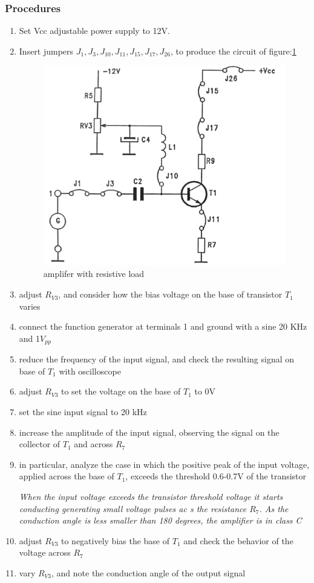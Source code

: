 \documentclass[12pt,a4paper]{report}
\begin{document}
\subsubsection{Procedures}
\begin{enumerate}
    \item Set Vcc adjustable power supply to 12V.
    \item Insert jumpers $J_1, J_3, J_{10}, J_{11}, J_{15}, J_{17}, J_{26}$, to produce the circuit of figure:\ref{fig:B32.2}
    \begin{figure}[H]
        \centering
        \includegraphics[width=0.5\linewidth]{analogue2_2.jpeg}
        \caption{amplifer with resistive load}
        \label{fig:B32.2}
    \end{figure}
    \item adjust $R_{V3}$, and consider how the bias voltage on the base of transistor $T_1$ varies
    \item connect the function generator at terminals 1 and ground with a sine 20 KHz and 1$V_{pp}$
    \item reduce the frequency of the input signal, and check the resulting signal on base of $T_1$ with oscilloscope
    \item adjust $R_{V3}$ to set the voltage on the base of $T_1$ to 0V
    \item set the sine input signal to 20 kHz
    \item increase the amplitude of the input signal, observing the signal on the collector of $T_1$ and across $R_7$
    \item in particular, analyze the case in which the positive peak of the input voltage, applied across the base of $T_1$, exceeds the threshold 0.6-0.7V of the transistor
    
\textit{When the input voltage exceeds the transistor threshold voltage it starts conducting generating small voltage pulses ac
s the resistance $R_7$. As the conduction angle is less smaller than 180 degrees, the amplifier is in class C}

    \item adjust $R_{V3}$ to negatively bias the base of $T_1$ and check the behavior of the voltage across $R_7$
    \item vary $R_{V3}$, and note the conduction angle of the output signal
\end{enumerate}
\end{document}
